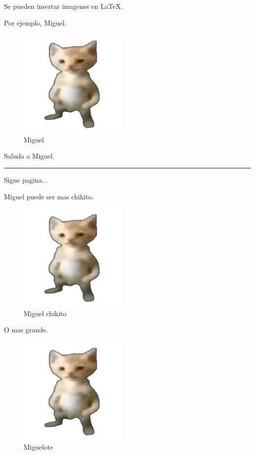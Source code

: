 \documentclass[12pt]{article}
\begin{document}
    Se pueden insertar imagenes en \LaTeX.

    Por ejemplo, Miguel.

    \begin{figure}[h]
        \centering %

        \includegraphics{miguel.png}

        \caption{Miguel} %
    \end{figure}

    Saluda a Miguel.

    \rule{5cm}{0.4pt}

    Sigue pagina...

    \newpage


    Miguel puede ser mas chikito.

    \begin{figure}[h]
        \centering

        \includegraphics[scale=0.2]{miguel.png}

        \caption{Miguel chikito}
    \end{figure}


    O mas grande.

    \begin{figure}[h]
        \centering

        \includegraphics[scale=2]{miguel.png}

        \caption{Miguelote}
    \end{figure}
\end{document}
